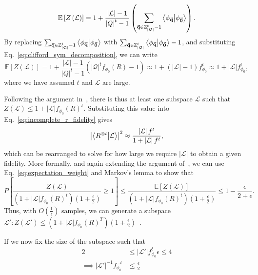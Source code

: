 \begin{equation}
\mathbb{E}\left[Z\left(\mathcal{L}\right)\right] = 1 + \frac{\left|\mathcal{L}\right|-1}{\left|Q\right|^{t}-1}\left(\sum_{\va{q}\in\mathbb{Z}_{\left|\mathcal{Q}\right|}^{t}-1}\braket{\phi_{\va{q}}}{\phi_{\va{0}}}\right).
\end{equation}
By replacing $\sum_{\va{q}\in\mathbb{Z}_{\left|\mathcal{Q}\right|}^{t}-1}\braket{\phi_{\va{q}}}{\phi_{\va{0}}}$ with $\sum_{\va{q}\in\mathbb{Z}_{\left|\mathcal{Q}\right|}^{t}}\braket{\phi_{\va{q}}}{\phi_{\va{0}}} -1$, and substituting Eq.~\ref{eq:clifford_sym_decomposition}, we can write
\begin{equation}
\mathbb{E}\left[Z\left(\mathcal{L}\right)\right] = 1 + \frac{\left|\mathcal{L}\right|-1}{\left|Q\right|^{t}-1}\left(\left|\mathcal{Q}\right|^{t}f_{\phi_{0}}\left(R\right)-1\right)\approx 1+\left(\left|\mathcal{L}\right|-1\right)f_{\phi_{0}}^{t}\approx 1+\left|\mathcal{L}\right|f_{\phi_{0}}^{t},
\label{eq:expectation_weight}
\end{equation}
where we have assumed $t$ and $\mathcal{L}$ are large.\par
Following the argument in~\cite{Bravyi2016}, there is thus at least one subspace $\mathcal{L}$ such that $Z\left(\mathcal{L}\right)\leq 1+\left|\mathcal{L}\right|f_{\phi_{0}}(R)^{t}$. Substituting this value into Eq.~\ref{eq:incomplete_r_fidelity} gives
\[
\left|\braket{R^{\otimes t}}{\mathcal{L}}\right|^{2} \approx \frac{\left|\mathcal{L}\right|f^{t}}{1+\left|\mathcal{L}\right|f^{t}},
\]
which can be rearranged to solve for how large we require $\left|\mathcal{L}\right|$ to obtain a given fidelity. More formally, and again extending the argument of~\cite{Bravyi2016}, we can use Eq.~\ref{eq:expectation_weight} and Markov's lemma to show that
\[P\left[ \frac{Z\left(\mathcal{L}\right)}{\left(1+\left|\mathcal{L}\right|f_{\phi_{0}}(R)^{t}\right)(1+\frac{\epsilon}{2})}\geq 1 \right] \leq \frac{\mathbb{E}\left[Z(\mathcal{L})\right]}{\left(1+\left|\mathcal{L}\right|f_{\phi_{0}}(R)^{t}\right)(1+\frac{\epsilon}{2})}\leq 1 - \frac{\epsilon}{2+\epsilon}.\]
Thus, with $O(\frac{1}{\epsilon})$ samples, we can generate a subspace $\mathcal{L'}:Z\left(\mathcal{L'}\right)\leq \left(1+\left|\mathcal{L}\right|f_{\phi_{0}}(R)^{T}\right)\left(1+\frac{\epsilon}{2}\right)$~\cite{Bravyi2016}.\par
If we now fix the size of the subspace such that
\begin{align*}
2&\leq \left|\mathcal{L'}\right|f_{\phi_{0}}^{t}\epsilon \leq 4 \\
\implies \left|\mathcal{L'}\right|^{-1}f_{\phi_{0}}^{-t}&\leq \frac{\epsilon}{2}
\end{align*}
